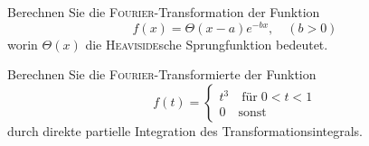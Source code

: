 \documentclass{atistandalonetask}
\begin{document}
  \begin{atiTask}[
    title = \textsc{Fourier}-Transformationen
  ]
	\begin{atiSubtasks}
	\item Berechnen Sie die \textsc{Fourier}-Transformation der Funktion
	\[
	f(x)=\Theta(x-a)e^{-bx},\quad (b>0)
	\]
	worin $\Theta(x)$ die \textsc{Heaviside}sche Sprungfunktion bedeutet.
	\item Berechnen Sie die \textsc{Fourier}-Transformierte der Funktion
	\[
	f(t)=\begin{cases}
	t^3\quad \text{für}\; 0<t<1\\
	0\quad \text{sonst}
		 \end{cases}
	\]
	durch direkte partielle Integration des Transformationsintegrals.
	\end{atiSubtasks}
  \end{atiTask}
  \begin{atiSolution}
      
  \end{atiSolution}
\end{document}
